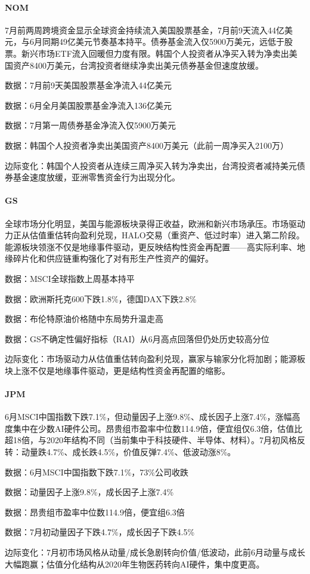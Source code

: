 \documentclass[11pt]{ctexart}
\begin{document}
\paragraph{NOM} 7月前两周跨境资金显示全球资金持续流入美国股票基金，7月前9天流入44亿美元，与6月同期49亿美元节奏基本持平。债券基金流入仅5900万美元，远低于股票。新兴市场ETF流入回暖但力度有限。韩国个人投资者从净买入转为净卖出美国资产8400万美元，台湾投资者继续净卖出美元债券基金但速度放缓。
{\small\color{refgray}数据：7月前9天美国股票基金净流入44亿美元\par}
{\small\color{refgray}数据：6月全月美国股票基金净流入136亿美元\par}
{\small\color{refgray}数据：7月第一周债券基金净流入仅5900万美元\par}
{\small\color{refgray}数据：韩国个人投资者净卖出美国资产8400万美元（此前一周净买入2100万）\par}
{\small\color{refgray}边际变化：韩国个人投资者从连续三周净买入转为净卖出，台湾投资者减持美元债券基金速度放缓，亚洲零售资金行为出现分化。\par}
\paragraph{GS} 全球市场分化明显，美国与能源板块录得正收益，欧洲和新兴市场承压。市场驱动力正从估值重估转向盈利兑现，HALO交易（重资产、低过时率）进入第二阶段。能源板块领涨不仅是地缘事件驱动，更反映结构性资金再配置——高实际利率、地缘碎片化和供应链重构强化了对有形生产性资产的偏好。
{\small\color{refgray}数据：MSCI全球指数上周基本持平\par}
{\small\color{refgray}数据：欧洲斯托克600下跌1.8\%，德国DAX下跌2.8\%\par}
{\small\color{refgray}数据：布伦特原油价格随中东局势升温走高\par}
{\small\color{refgray}数据：GS不确定性偏好指标（RAI）从6月高点回落但仍处历史较高分位\par}
{\small\color{refgray}边际变化：市场驱动力从估值重估转向盈利兑现，赢家与输家分化将加剧；能源板块上涨不仅是地缘事件驱动，更是结构性资金再配置的缩影。\par}
\paragraph{JPM} 6月MSCI中国指数下跌7.1\%，但动量因子上涨9.8\%、成长因子上涨7.4\%，涨幅高度集中在少数AI硬件公司。昂贵组市盈率中位数114.9倍，便宜组仅6.3倍，估值比超18倍，与2020年结构不同（当前集中于科技硬件、半导体、材料）。7月初风格反转：动量跌4.7\%、成长跌4.5\%，价值反弹7.4\%、低波动涨8\%。
{\small\color{refgray}数据：6月MSCI中国指数下跌7.1\%，73\%公司收跌\par}
{\small\color{refgray}数据：动量因子上涨9.8\%，成长因子上涨7.4\%\par}
{\small\color{refgray}数据：昂贵组市盈率中位数114.9倍，便宜组6.3倍\par}
{\small\color{refgray}数据：7月初动量因子下跌4.7\%，成长因子下跌4.5\%\par}
{\small\color{refgray}边际变化：7月初市场风格从动量/成长急剧转向价值/低波动，此前6月动量与成长大幅跑赢；估值分化结构从2020年生物医药转向AI硬件，集中度更高。\par}
\end{document}
